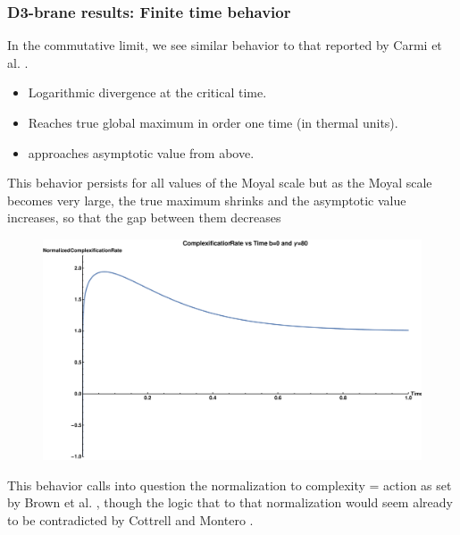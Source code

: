 \documentclass[8pt,aspectratio=169]{beamer}
\begin{document}
\begin{frame}
\frametitle{D3-brane results: Finite time behavior}

In the commutative limit, we see similar behavior to that reported by Carmi et al. \cite{Carmi:2017jqz}.

\begin{minipage}[t]{0.48\linewidth}

\begin{itemize}

\item Logarithmic divergence at the critical time.

\item Reaches true global maximum in order one time (in thermal units).

\item approaches asymptotic value from above.

\end{itemize}

This behavior persists for all values of the Moyal scale  but as the Moyal scale becomes very large, the true maximum shrinks and the asymptotic value increases, so that the gap between them decreases

\end{minipage}
%
\begin{minipage}[t]{0.48\linewidth}

\begin{figure}
    \begin{center}
        \includegraphics[scale=0.15]{FiniteTime1}
    \end{center}
\end{figure}

\end{minipage}
\vspace{5mm}

This behavior calls into question the normalization to complexity = action as set by Brown et al. \cite{Brown:2015bva, Brown:2015lvg}, though the logic that to that normalization would seem already to be contradicted by Cottrell and Montero \cite{Cottrell:2017ayj}.

\end{frame}
\end{document}
